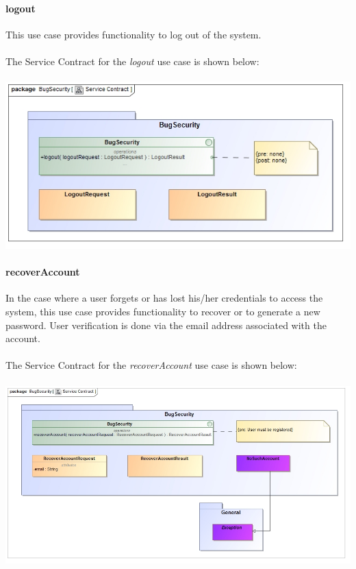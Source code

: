 \documentclass[11pt,a4paper,titlepage]{article}
\begin{document}
		\paragraph{logout }
		This use case provides functionality to log out of the system.\\\hfill\\
		The Service Contract for the \textit{logout} use case is shown below:\\\hfill\\
		\includegraphics[width=\linewidth]{LogoutSC}
		
		\paragraph{recoverAccount }
		In the case where a user forgets or has lost his/her credentials to access the system, this use case provides functionality to recover or to generate a new password. User verification is done via the email address associated with the account.\\\hfill\\ 
		The Service Contract for the \textit{recoverAccount} use case is shown below:\\\hfill\\
		\includegraphics[width=\linewidth]{RecoverAccountSC}
		
\end{document}
